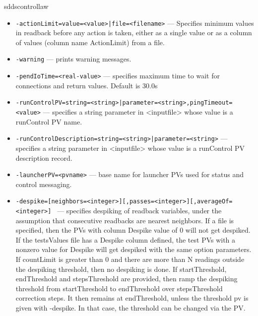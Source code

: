 \begin{sddsprog}{sddscontrollaw}
\begin{itemize}
  \item {\tt -actionLimit=value=<value>|file=<filename>} --- Specifies minimum values in readback before any action is
               taken, either as a single value or as a column of values
               (column name ActionLimit) from a file.
  \item {\tt -warning} --- prints warning messages.
  \item {\tt -pendIoTime=<real-value>} --- specifies maximum time to wait for connections and
               return values.  Default is 30.0s
  \item {\tt -runControlPV=string=<string>|parameter=<string>,pingTimeout=<value>} --- specifies a string parameter in <inputfile> whose value
               is a runControl PV name.
  \item {\tt -runControlDescription=string=<string>|parameter=<string>} ---
               specifies a string parameter in <inputfile> whose value
               is a runControl PV description record.
  \item {\tt -launcherPV=<pvname>} --- base name for launcher PVs used for status and control messaging.
  \item {\tt -despike=[neighbors=<integer>][,passes=<integer>][,averageOf=<integer>] \newline
      [,threshold=<value>][,pvthreshold=<pvname>][,file=<filename>][,countLimit=<integer>] \newline
      [,startThreshold=<value>,endThreshold=<value>,stepsThreshold=<integer>] \newline
      [,rampThresholdPV=<string>]} ---
                specifies despiking of readback variables,
               under the assumption
               that consecutive readbacks are nearest neighbors. If a file is
               specified, then the PVs with column Despike value of 0 will not
               get despiked. If the testsValues file has a Despike column defined,
               the test PVs with a nonzero value for Despike will get despiked
               with the same option parameters. If countLimit is greater than 0
               and there are more than N readings outside the despiking threshold,
               then no despiking is done.
               If startThreshold, endThreshold and stepsThreshold
               are provided, then ramp the despiking threshold from startThreshold to
               endThreshold over stepsThreshold correction steps. It then remains at
               endThreshold, unless the threshold pv is given with -despike.
               In that case, the threshold can be changed via the PV.

\end{itemize}
\end{sddsprog}

